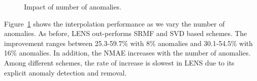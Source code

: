 \begin{figure}[h!]
{  }
  \caption{Impact of number of anomalies.}
  \label{fig:anomaly-number-interpolation}
\end{figure}

Figure~\ref{fig:anomaly-number-interpolation} shows the interpolation
performance as we vary the number of anomalies. As before, LENS
out-performs SRMF and SVD based schemes. 
The improvement ranges between
25.3-59.7\% with 8\% anomalies and 30.1-54.5\% with 16\% anomalies. In
addition, the NMAE increases with the number of anomalies.
Among different
schemes, the rate of increase is slowest in LENS due to its
explicit anomaly detection and removal.


